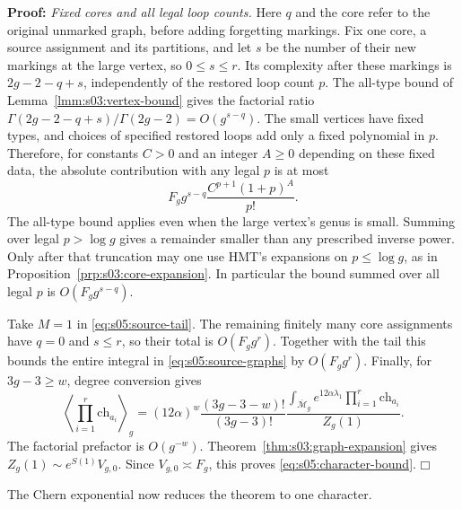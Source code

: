\documentclass[a4paper,10pt]{article}
\numberwithin{equation}{section}
\newcommand{\MM}{\overline{\mathcal{M}}}
\theoremstyle{paperplain}
\theoremstyle{paperremark}
\theoremstyle{paperplain}
\newenvironment{prf}{\noindent \textbf{Proof: }}{\hfill $\mdlgwhtsquare$\par\addvspace{0.5\baselineskip}}
\begin{document}
\begin{prf}
\emph{Fixed cores and all legal loop counts.}
Here $q$ and the core refer to the original unmarked graph, before
adding forgetting markings. Fix one core, a source assignment and
its partitions, and let $s$ be the number of their new markings at
the large vertex, so $0\leq s\leq r$. Its complexity after these
markings is $2g-2-q+s$, independently of the restored loop count
$p$. The all-type bound of Lemma~\ref{lmm:s03:vertex-bound} gives
the factorial ratio
$\Gamma(2g-2-q+s)/\Gamma(2g-2)=O(g^{s-q})$.
The small vertices have fixed types, and choices of specified
restored loops add only a fixed polynomial in $p$. Therefore, for
constants $C>0$ and an integer $A\geq0$ depending on these fixed
data, the absolute contribution with any legal $p$ is at most
\begin{equation}\label{eq:s05:decorated-core-bound}
 F_g g^{s-q}\frac{C^{p+1}(1+p)^A}{p!}.
\end{equation}
The all-type bound applies even when the large vertex's genus is
small. Summing over legal $p>\log g$ gives a remainder smaller
than any prescribed inverse power. Only after that truncation may
one use HMT's expansions on $p\leq\log g$, as in
Proposition~\ref{prp:s03:core-expansion}. In particular the bound
summed over all legal $p$ is $O(F_g g^{s-q})$.

Take $M=1$ in \eqref{eq:s05:source-tail}. The remaining finitely
many core assignments have $q=0$ and $s\leq r$, so their total is
$O(F_g g^r)$. Together with the tail this bounds the entire
integral in \eqref{eq:s05:source-graphs} by $O(F_g g^r)$.
Finally, for $3g-3\geq w$, degree conversion gives
\begin{equation}\label{eq:s05:character-normalization}
 \left\langle\prod_{i=1}^r\mathrm{ch}_{a_i}\right\rangle_g
 =(12\alpha)^w\frac{(3g-3-w)!}{(3g-3)!}
 \frac{\displaystyle\int_{\MM_g}e^{12\alpha\lambda_1}
                    \prod_{i=1}^r\mathrm{ch}_{a_i}}
      {Z_g(1)}.
\end{equation}
The factorial prefactor is $O(g^{-w})$.
Theorem~\ref{thm:s03:graph-expansion} gives
$Z_g(1)\sim e^{S(1)}V_{g,0}$.
Since $V_{g,0}\asymp F_g$, this proves
\eqref{eq:s05:character-bound}.
\end{prf}

The Chern exponential now reduces the theorem to one character.
\end{document}
